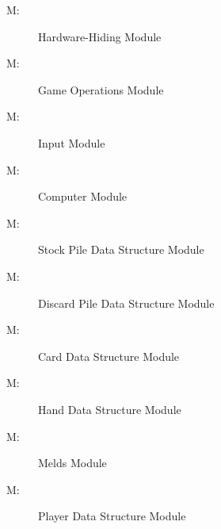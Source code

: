 \documentclass[12pt, titlepage]{article}
\newcounter{mnum}
\newcommand{\mthemnum}{M\themnum}
\begin{document}
\begin{description}
\item [ \mthemnum \label{mHH}:] Hardware-Hiding Module

\item [
 \mthemnum \label{mGO}:] Game Operations Module

\item [ \mthemnum \label{mI}:] Input Module

\item [ \mthemnum \label{mC}:] Computer Module

\item [ \mthemnum \label{mSP}:] Stock Pile Data Structure Module

\item [ \mthemnum \label{mDP}:] Discard Pile Data Structure Module

\item [ \mthemnum \label{mCard}:] Card Data Structure Module

\item [ \mthemnum \label{mH}:] Hand Data Structure Module

\item [
\mthemnum \label{mM}:] Melds Module

\item [
\mthemnum \label{mP}:] Player Data Structure Module
\end{description}
\end{document}
